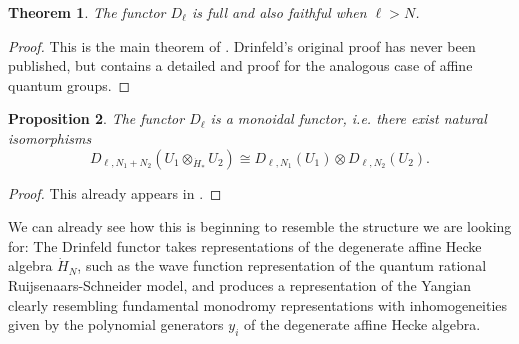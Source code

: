 \documentclass[11pt]{report}
\newtheorem{theorem}{Theorem}[section]
\newtheorem{prop}[theorem]{Proposition}
\theoremstyle{definition}
\theoremstyle{remark}
\theoremstyle{remark}
\newcommand{\C}{\mathbb{C}}
\begin{document}
\begin{theorem}
The functor $D_\ell$ is full and also faithful when $\ell > N$. %
\end{theorem}

\begin{proof}
This is the main theorem of \cite{article:drinfeld:1986}. Drinfeld's original proof has never been published, but \cite{article:chari:1995} contains a detailed and proof for the analogous case of affine quantum groups.
\end{proof}

\begin{prop}
The functor $D_\ell$ is a monoidal functor, \emph{i.e.} there exist natural isomorphisms
\begin{equation*}
D_{\ell,N_1+N_2}(U_1 \otimes_{\dot H_*} U_2) \cong D_{\ell,N_1}(U_1) \otimes D_{\ell,N_2}(U_2).
\end{equation*}
\end{prop}

\begin{proof}
This already appears in \cite{article:drinfeld:1986}.
\end{proof}

%

We can already see how this is beginning to resemble the structure we are looking for: The Drinfeld functor takes representations of the degenerate affine Hecke algebra $\dot H_N$, such as the wave function representation of the quantum rational Ruijsenaars-Schneider model, and produces a representation of the Yangian clearly resembling fundamental monodromy representations with inhomogeneities given by the polynomial generators $y_i$ of the degenerate affine Hecke algebra.
\end{document}
